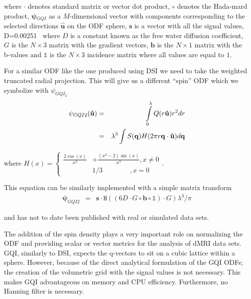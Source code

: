 \documentclass{bioinfo}
\begin{document}
\noindent where $\cdot$ denotes standard matrix or vector dot product,
\foreignlanguage{british}{$\circ$ }denotes the Hada-mard product,
$\bm{\psi}{}_{GQI}$ as a $M$-dimensional vector with components
corresponding to the selected directions $\hat{\mathbf{u}}$ on the
ODF sphere, $\mathbf{s}$ is a vector with all the signal values,
D=0.00251~\citep{canalesrodriguez2009} \foreignlanguage{british}{where
$D$ is a constant known as the free water diffusion coefficient},
$G$ is the $N\times3$ matrix with the gradient vectors, $\mathbf{b}$
is the $N\times1$ matrix with the b-values and $\mathbb{1}$ is the
$N\times3$ incidence matrix where all values are equal to $1$.

For a similar ODF like the one produced using DSI we need to take
the weighted truncated radial projection. This will give us a different
{}``spin'' ODF which we symbolize with $\psi_{GQI_{2}}$\begin{eqnarray}
\psi_{GQI2}(\mathbf{\hat{u}}) & = & \intop_{0}^{\lambda}Q(r\mathbf{\hat{u}})r^{2}dr\label{eq:SDF2}\\
 & = & \lambda^{3}\int S(\mathbf{q})H(2\pi r\mathbf{q}\cdot\mathbf{\hat{u}})d\mathbf{q}\end{eqnarray}


\noindent where $H(x)=\begin{cases}
\frac{2\cos(x)}{x^{2}} & +\frac{(x^{2}-2)\sin(x)}{x^{3}},x\neq0\\
 & 1/3\qquad\qquad,x=0\end{cases}$.

\begin{flushleft}
This equation can be similarly implemented with a simple matrix transform\begin{eqnarray*}
\bm{\psi}_{GQI2} & = & \mathbf{s}\cdot\mathtt{H}((6D\cdot G\circ\mathbf{b}\circ\mathbb{1})\cdot G)\lambda^{3}/\pi\end{eqnarray*}

\par\end{flushleft}

\begin{flushleft}
and has not to date been published with real or simulated data sets.
\par\end{flushleft}

The addition of the spin density plays a very important role on normalizing
the ODF and providing scalar or vector metrics for the analysis of
dMRI data sets. GQI, similarly to DSI, expects the q-vectors to sit
on a cubic lattice within a sphere. However, because of the direct
analytical formulation of the GQI ODFs; the creation of the volumetric
grid with the signal values is not necessary. This makes GQI advantageous
on memory and CPU efficiency. Furthermore, no Hanning filter is necessary.
\end{document}

